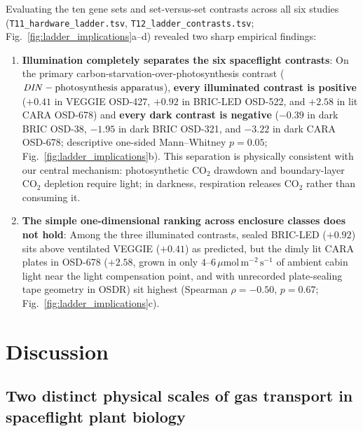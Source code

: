 \documentclass[10pt,twocolumn,a4paper]{article}
\newcommand{\ums}{\ensuremath{\mu\mathrm{mol\,m^{-2}\,s^{-1}}}}
\begin{document}
Evaluating the ten gene sets and set-versus-set contrasts across all six studies (\texttt{T11\_hardware\_ladder.tsv}, \texttt{T12\_ladder\_contrasts.tsv}; Fig.~\ref{fig:ladder_implications}a--d) revealed two sharp empirical findings:
\begin{enumerate}
    \item \textbf{Illumination completely separates the six spaceflight contrasts}: On the primary carbon-starvation-over-photosynthesis contrast ($\text{\textit{DIN}} - \text{photosynthesis apparatus}$), \textbf{every illuminated contrast is positive} ($+0.41$ in VEGGIE OSD-427, $+0.92$ in BRIC-LED OSD-522, and $+2.58$ in lit CARA OSD-678) and \textbf{every dark contrast is negative} ($-0.39$ in dark BRIC OSD-38, $-1.95$ in dark BRIC OSD-321, and $-3.22$ in dark CARA OSD-678; descriptive one-sided Mann--Whitney $p = 0.05$; Fig.~\ref{fig:ladder_implications}b). This separation is physically consistent with our central mechanism: photosynthetic $\mathrm{CO_2}$ drawdown and boundary-layer $\mathrm{CO_2}$ depletion require light; in darkness, respiration releases $\mathrm{CO_2}$ rather than consuming it.
    \item \textbf{The simple one-dimensional ranking across enclosure classes does not hold}: Among the three illuminated contrasts, sealed BRIC-LED ($+0.92$) sits above ventilated VEGGIE ($+0.41$) as predicted, but the dimly lit CARA plates in OSD-678 ($+2.58$, grown in only $4\text{--}6\,\ums$ of ambient cabin light near the light compensation point, and with unrecorded plate-sealing tape geometry in OSDR) sit highest (Spearman $\rho = -0.50$, $p = 0.67$; Fig.~\ref{fig:ladder_implications}c).
\end{enumerate}

\section*{Discussion}\label{sec:discussion}

\subsection*{Two distinct physical scales of gas transport in spaceflight plant biology}
\end{document}
